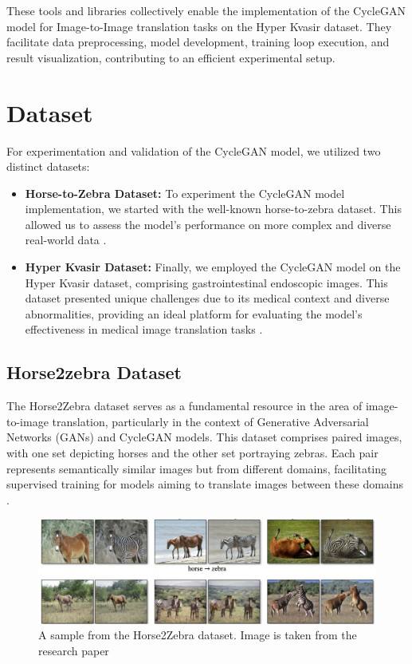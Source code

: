 \documentclass[UKenglish,12pt]{master-style}
\begin{document}
These tools and libraries  \cite{PyTorch_horse2zebra} collectively enable the implementation of the CycleGAN model for Image-to-Image translation tasks on the Hyper Kvasir dataset. They facilitate data preprocessing, model development, training loop execution, and result visualization, contributing to an efficient experimental setup.

\section{Dataset}

For experimentation and validation of the CycleGAN model, we utilized two distinct datasets:
\begin{itemize}

\item \textbf{Horse-to-Zebra Dataset: }To experiment the CycleGAN model implementation, we started with the well-known horse-to-zebra dataset. This allowed us to assess the model's performance on more complex and diverse real-world data \cite{PyTorch_horse2zebra}. 

\item \textbf{Hyper Kvasir Dataset:} Finally, we employed the CycleGAN model on the Hyper Kvasir dataset, comprising gastrointestinal endoscopic images. This dataset presented unique challenges due to its medical context and diverse abnormalities, providing an ideal platform for evaluating the model's effectiveness in medical image translation tasks \cite{pytorch_hyperkvasir}. 
\end{itemize}

\subsection{Horse2zebra Dataset}

The Horse2Zebra dataset serves as a fundamental resource in the area of image-to-image translation, particularly in the context of Generative Adversarial Networks (GANs) and CycleGAN models. This dataset comprises paired images, with one set depicting horses and the other set portraying zebras. Each pair represents semantically similar images but from different domains, facilitating supervised training for models aiming to translate images between these domains \cite{unpaired_horse2zebra_cyclgan}.


\begin{figure}[ht]
    \centering
    \includegraphics[width=1\textwidth]{Images/horse2zebra.png}
    \caption{A sample from the Horse2Zebra dataset. Image is taken from the research paper \cite{unpaired_horse2zebra_cyclgan}}
    \label{fig:horse2zebra}
\end{figure}
\end{document}
